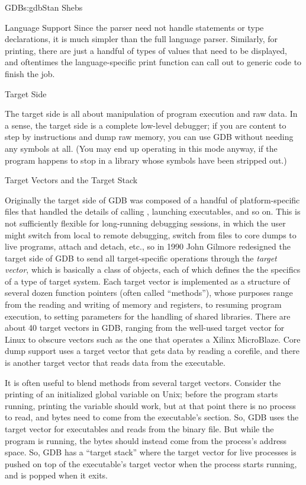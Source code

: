 \begin{aosachapter}{GDB}{s:gdb}{Stan Shebs}
\begin{aosasect2}{Language Support}
Since the parser need not handle statements or type
declarations, it is much simpler than the full language parser.  
Similarly, for printing, there are just a handful of types of values
that need to be displayed, and oftentimes the language-specific print
function can call out to generic code to finish the job.

\end{aosasect2}

\begin{aosasect1}{Target Side}

The target side is all about manipulation of program execution and raw data.
In a sense, the target side is a complete low-level debugger; if you
are content to step by instructions and dump raw memory, you can use
GDB without needing any symbols at all.  (You may end up operating in
this mode anyway, if the program happens to stop in a library whose
symbols have been stripped out.)

\begin{aosasect2}{Target Vectors and the Target Stack}

Originally the target side of GDB was composed of a handful of
platform-specific files that handled the details of calling
, launching executables, and so on.  This is not sufficiently flexible for long-running debugging sessions,
in which the user might switch from local to remote debugging, switch
from files to core dumps to live programs, attach and detach, etc., so in 1990 John Gilmore redesigned the target side of GDB to send all
target-specific operations through the {\em target vector}, which is
basically a class of objects, each of which defines the the specifics
of a type of target system.  Each target vector is implemented as a
structure of several dozen function pointers (often called
``methods''), whose purposes range from the reading and writing of
memory and registers, to resuming program execution, to setting
parameters for the handling of shared libraries.  There are about 40
target vectors in GDB, ranging from the well-used target vector for
Linux to obscure vectors such as the one that operates a Xilinx
MicroBlaze.  Core dump support uses a target vector that gets data by
reading a corefile, and there is another target vector that reads data
from the executable.

It is often useful to blend methods from several target vectors.
Consider the printing of an initialized global variable on Unix;
before the program starts running, printing the variable should work,
but at that point there is no process to read, and bytes need to come
from the executable's  section.  So, GDB uses the target
vector for executables and reads from the binary file.  But while the
program is running, the bytes should instead come from the process's
address space.  So, GDB has a ``target stack'' where the target vector
for live processes is pushed on top of the executable's target vector
when the process starts running, and is popped when it exits.


\end{aosasect2}
\end{aosasect1}
\end{aosachapter}
